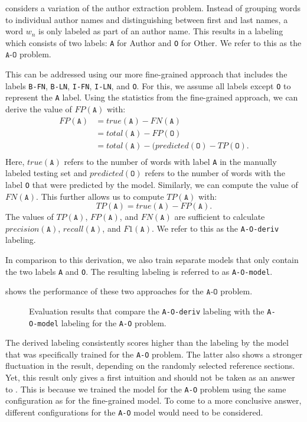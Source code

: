 \bigskip

 considers a variation of the author extraction problem.
Instead of grouping words to individual author names and distinguishing between first and last names, a word $w_n$ is only labeled as part of an author name.
This results in a labeling which consists of two labels:
\texttt{A} for Author and \texttt{O} for Other.
We refer to this as the $\texttt{A-O}$ problem.

This can be addressed using our more fine-grained approach that includes the labels \texttt{B-FN}, \texttt{B-LN}, \texttt{I-FN}, \texttt{I-LN}, and \texttt{O}.
For this, we assume all labels except \texttt{O} to represent the \texttt{A} label.
Using the statistics from the fine-grained approach, we can derive the value of $FP(\texttt{A})$ with:
\begin{equation*}
\begin{split}
  FP(\texttt{A})&=true(\texttt{A})-FN(\texttt{A})\\
  &=total(\texttt{A})-FP(\texttt{O})\\
  &=total(\texttt{A})-(predicted(\texttt{O})-TP(\texttt{O}).\\
\end{split}
\end{equation*}
Here, $true(\texttt{A})$ refers to the number of words with label \texttt{A} in the manually labeled testing set and $predicted(\texttt{O})$ refers to the number of words with the label \texttt{O} that were predicted by the model.
Similarly, we can compute the value of $FN(\texttt{A})$.
This further allows us to compute $TP(\texttt{A})$ with:
\begin{equation*}
  TP(\texttt{A})=true(\texttt{A})-FP(\texttt{A}).
\end{equation*}
The values of $TP(\texttt{A})$, $FP(\texttt{A})$, and $FN(\texttt{A})$ are sufficient to calculate $precision(\texttt{A})$, $recall(\texttt{A})$, and $F1(\texttt{A})$.
We refer to this as the \texttt{A-O-deriv} labeling.

In comparison to this derivation, we also train separate models that only contain the two labels \texttt{A} and \texttt{O}.
The resulting labeling is referred to as \texttt{A-O-model}.

 shows the performance of these two approaches for the $\texttt{A-O}$ problem.
\begin{figure}[t]

\caption{Evaluation results that compare the \texttt{A-O-deriv} labeling with the \texttt{A-O-model} labeling for the \texttt{A-O} problem.}
\label{fig:eval-authors-only}
\end{figure}
The derived labeling consistently scores higher than the labeling by the model that was specifically trained for the \texttt{A-O} problem.
The latter also shows a stronger fluctuation in the result, depending on the randomly selected reference sections.
Yet, this result only gives a first intuition and should not be taken as an answer to .
This is because we trained the model for the \texttt{A-O} problem using the same configuration as for the fine-grained model.
To come to a more conclusive answer, different configurations for the \texttt{A-O} model would need to be considered.

